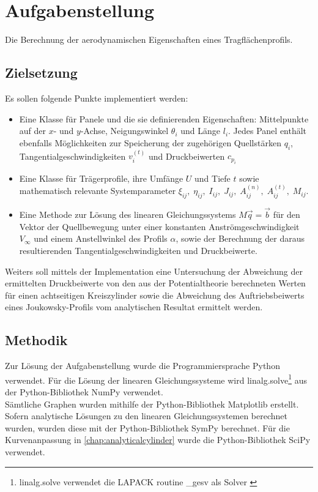 \chapter{Aufgabenstellung}
Die Berechnung der aerodynamischen Eigenschaften eines Tragflächenprofils.

\section{Zielsetzung}
Es sollen folgende Punkte implementiert werden:
\begin{itemize}
  \item Eine Klasse für Panele und die sie definierenden Eigenschaften: Mittelpunkte auf der $x$- und $y$-Achse, Neigungswinkel $\theta_{i}$ und Länge $l_i$. Jedes Panel enthält ebenfalls Möglichkeiten zur Speicherung der zugehörigen Quellstärken $q_i$, Tangentialgeschwindigkeiten $v_i^{(t)}$ und Druckbeiwerten $c_{p_i}$
  \item Eine Klasse für Trägerprofile, ihre Umfänge $U$ und Tiefe $t$ sowie mathematisch relevante Systemparameter $\xi_{ij}, \; \eta_{ij}, \; I_{ij}, \; J_{ij}, \; A_{ij}^{(n)}, \;A_{ij}^{(t)}, \;M_{ij}$.
  \item Eine Methode zur Lösung des linearen Gleichungssystems $M \vec q = \vec b$ für den Vektor der Quellbewegung unter einer konstanten Anströmgeschwindigkeit $V_{\infty}$ und einem Anstellwinkel des Profils $\alpha $, sowie der Berechnung der daraus resultierenden Tangentialgeschwindigkeiten und Druckbeiwerte.
\end{itemize}
Weiters soll mittels der Implementation eine Untersuchung der Abweichung der ermittelten Druckbeiwerte von den aus der Potentialtheorie berechneten Werten für einen achtseitigen Kreiszylinder sowie die Abweichung des Auftriebsbeiwerts eines Joukowsky-Profils vom analytischen Resultat ermittelt werden.

\section{Methodik}
Zur Lösung der Aufgabenstellung wurde die Programmiersprache Python verwendet. Für die Lösung der linearen Gleichungssysteme wird linalg.solve\footnote{linalg.solve verwendet die LAPACK routine \_gesv als Solver \cite{harris2020array}} aus der Python-Bibliothek NumPy verwendet. \cite{harris2020array}\\Sämtliche Graphen wurden mithilfe der Python-Bibliothek Matplotlib erstellt. \cite{Hunter:2007} Sofern analytische Lösungen zu den linearen Gleichungssystemen berechnet wurden, wurden diese mit der Python-Bibliothek SymPy berechnet. \cite{Sympy} Für die Kurvenanpassung in \ref{chap:analyticalcylinder} wurde die Python-Bibliothek SciPy verwendet. \cite{2020SciPy-NMeth}